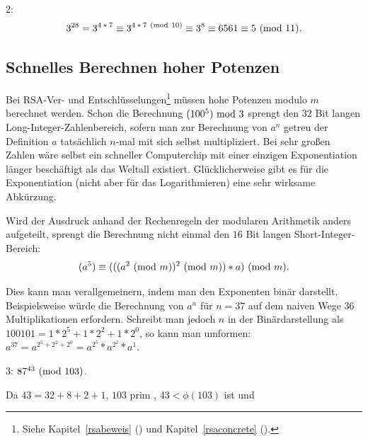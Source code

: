 \begin{refsegment}
\begin{example}{ 2:}
$$
3^{28} = 3^{4\:*\:7} \equiv 3^{4\:*\:7{\rm ~(mod~}10)} \equiv 3^8 \equiv 6561 \equiv 5 {\rm ~(mod~}11).
$$
\end{example}


\hypertarget{hohpot}{}
\subsection{Schnelles Berechnen hoher Potenzen}
\label{hohpot} 
Bei RSA-Ver- und Entschlüsselungen\footnote{%
Siehe Kapitel~\ref{rsabeweis} (\glqq {}\grqq) und
Kapitel~\ref{rsaconcrete} (\glqq {}\grqq).
} müssen hohe Potenzen modulo $m$ berechnet werden. Schon die Berechnung $(100^5)
{\rm ~mod~}3$ sprengt den $32$ Bit langen 
Long-Integer-Zahlenbereich, sofern man zur Berechnung von $a^n$ getreu der
Definition $a$ tatsächlich $n$-mal mit sich selbst multipliziert. Bei sehr
großen Zahlen wäre selbst ein
schneller Computerchip mit einer einzigen Exponentiation länger beschäftigt
als das Weltall existiert. Glücklicherweise gibt es für die Exponentiation
(nicht aber für das Logarithmieren) eine sehr wirksame Abkürzung.

Wird der Ausdruck anhand der Rechenregeln der modularen Arithmetik anders
aufgeteilt, sprengt die Berechnung nicht einmal den $16$ Bit langen
Short-Integer-Bereich:
$$
(a^5) \equiv (((a^2{\rm ~(mod~}m))^2 {\rm ~(mod~}m)) * a){\rm ~(mod~}m).
$$


Dies kann man verallgemeinern, indem man den Exponenten binär darstellt.
Beispielsweise würde die Berechnung von $a^n$ für $n = 37$ auf dem naiven Wege $36$
Multiplikationen erfordern.
Schreibt man jedoch $n$ in der Binärdarstellung als $100101 = 1*2^5 + 1*2^2 + 1*2^0$,
so kann man umformen: $a^{37} = a^{2^5 + 2^2 + 2^0} = a^{2^5} * a^{2^2} * a^1$.\\


\begin{example}{ 3:} $87^{43}{\rm ~(mod~}103)$.

Da $43 = 32+8+2+1$, $103$ prim , $43<\phi(103)$ ist und


\end{example}
\end{refsegment}
